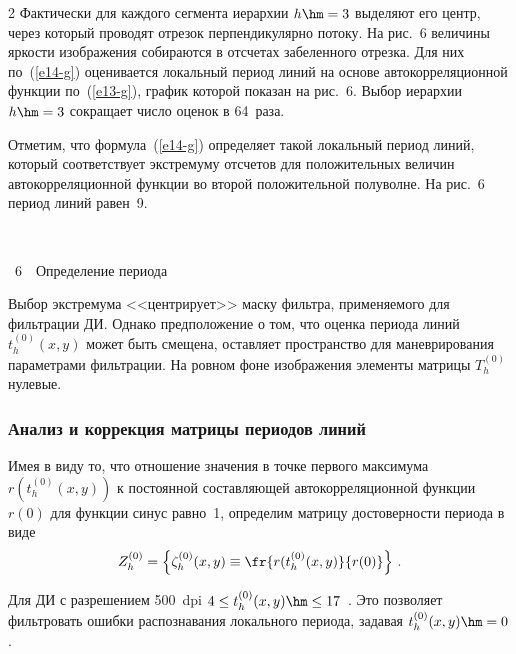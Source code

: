\begin{multicols}{2}
  Фактически для каждого сегмента иерархии $h\hm=3$ выделяют его центр, 
через который проводят отрезок перпендикулярно потоку. На рис.~6 величины 
яркости изображения собираются в отсчетах забеленного отрезка. Для них 
по~(\ref{e14-g}) оценивается локальный период линий на основе 
автокорреляционной функции по~(\ref{e13-g}), график которой показан на 
рис.~6. Выбор иерархии $h\hm=3$ сокращает число оценок в 64~раза.
  
  Отметим, что формула~(\ref{e14-g}) определяет такой локальный период 
линий, который соответствует экстремуму отсчетов для положительных 
величин автокорреляционной функции во второй положительной полуволне. 
На рис.~6 период линий равен~9.
\begin{center} %
\vspace*{3pt}
\mbox{%
 \epsfxsize=72.704mm
}
\end{center}
\begin{center}
\vspace*{3pt}
{{\figurename~6}\ \ \small{Определение периода}}
\end{center}
\vspace*{9pt}

\addtocounter{figure}{1}

\noindent
 Выбор экстремума <<центрирует>> маску 
фильт\-ра, применяемого для фильтрации ДИ. Однако предположение о том, что 
оценка периода линий $t_h^{(0)}(x,y)$ может быть смещена, оставляет 
пространство для маневрирования параметрами фильтрации. На ровном фоне 
изображения элементы мат\-ри\-цы $T_h^{(0)}$ нулевые.


  \subsubsection*{Анализ и коррекция матрицы периодов линий}
  
  Имея в виду то, что 
отношение значения в точке первого максимума $r(t_h^{(0)}(x,y))$ к 
постоянной составляющей автокорреляционной функции~$r(0)$ для функции 
синус равно~1, определим матрицу достоверности периода в виде
  \begin{equation}
  Z_h^{(0)} =\left\{ \zeta_h^{(0)}(x,y)\equiv \fr{r(t_h^{(0)}(x,y)}{r(0)}\right\}\,.
  \label{e15-g}
  \end{equation}
  
  Для ДИ с разрешением 500~dpi $4\leq t_h^{(0)}(x,y)\hm\leq 17$~\cite{1-g}. 
Это позволяет фильтровать ошибки распознавания локального периода, задавая 
$t_h^{(0)}(x,y)\hm=0$.
  

\end{multicols}
